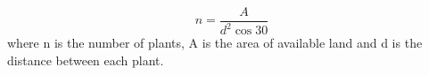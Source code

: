 \documentclass{amsart}
\begin{document}
            \begin{equation}
                n = \frac{A}{d^2 \cos{30}}
            \end{equation}
            where n is the number of plants, A is the area of available land and d is the distance between each plant.



\newpage
\printbibliography[title={References}]
\end{document}
